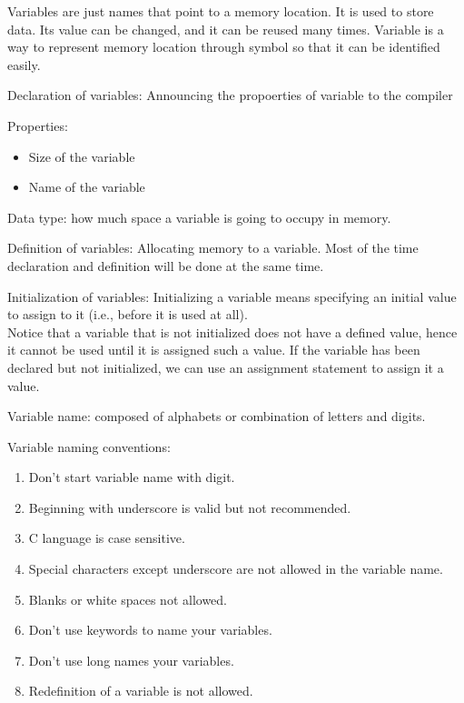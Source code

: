 Variables are just names that point to a memory location. It is used to store data. Its value can be changed, and it can be reused many times. Variable is a way to represent memory location through symbol so that it can be identified easily.

\par Declaration of variables: Announcing the propoerties of variable to the compiler

Properties: 
\begin{itemize}
    \item Size of the variable
    \item Name of the variable
\end{itemize}

Data type: how much space a variable is going to occupy in memory.

\par Definition of variables: Allocating memory to a variable.
Most of the time declaration and definition will be done at the same time.


Initialization of variables: Initializing a variable means specifying an initial value to assign to it (i.e., before it is used at all).\\
Notice that a variable that is not initialized does not have a defined value, hence it cannot be used until it is assigned such a value. If the variable has been declared but not initialized, we can use an assignment statement to assign it a value.


Variable name: composed of alphabets or combination of letters and digits.

Variable naming conventions: 
\begin{enumerate}
    \item Don't start variable name with digit.
    \item Beginning with underscore is valid but not recommended.
    \item C language is case sensitive.
    \item Special characters except underscore are not allowed in the variable name.
    \item Blanks or white spaces not allowed.
    \item Don't use keywords to name your variables.
    \item Don't use long names your variables.
    \item Redefinition of a variable is not allowed.
\end{enumerate}



